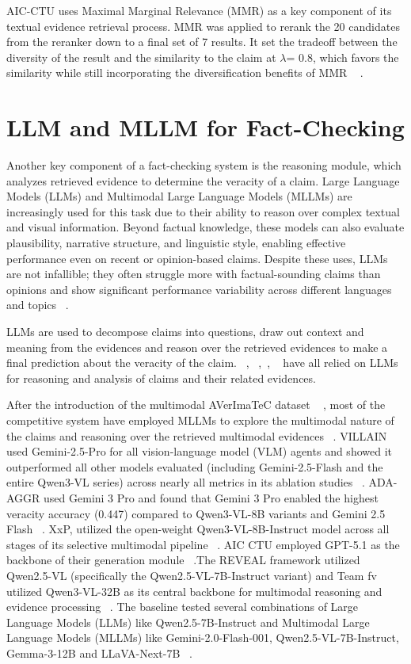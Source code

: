 AIC-CTU uses Maximal Marginal Relevance (MMR) as a key component of its textual evidence retrieval process. MMR was applied to rerank the 20 candidates from the reranker down to a final set of 7 results. It set the tradeoff between the diversity of the result and the similarity to the claim at $\lambda$= 0.8, which favors the similarity while still incorporating the diversification benefits of MMR  ~\cite{Ullrich2026Mar} .


\section{LLM and MLLM for Fact-Checking}

Another key component of a fact-checking system is the reasoning module, which analyzes retrieved evidence to determine the veracity of a claim. Large Language Models (LLMs) and Multimodal Large Language Models (MLLMs) are increasingly used for this task due to their ability to reason over complex textual and visual information. Beyond factual knowledge, these models can also evaluate plausibility, narrative structure, and linguistic style, enabling effective performance even on recent or opinion-based claims.
Despite these uses, LLMs are not infallible; they often struggle more with factual-sounding claims than opinions and show significant performance variability across different languages and topics ~\cite{Tang2024Nov}.

LLMs are used to decompose claims into questions, draw out context and meaning from the evidences and reason over the retrieved evidences to make a final prediction about the veracity of the claim. ~\citet{Schlichtkrull2023May}, ~\citet{Schlichtkrull2024Nov},~\citet{Ullrich2024Nov}, ~\citet{Ullrich2025Aug} have all relied on LLMs for reasoning and analysis of claims and their related evidences.

After the introduction of the multimodal AVerImaTeC  dataset  ~\cite{Cao2025May} , most of the competitive system have employed MLLMs to explore the multimodal nature of the claims and reasoning over the retrieved multimodal evidences ~\cite{Cao2026Mar}.
VILLAIN used Gemini-2.5-Pro for all vision-language model (VLM) agents and showed it outperformed all other models evaluated (including Gemini-2.5-Flash and the entire Qwen3-VL series) across nearly all metrics in its ablation studies ~\cite{Jung2026Mar}. ADA-AGGR used Gemini 3 Pro and found that Gemini 3 Pro enabled the highest veracity accuracy (0.447) compared to Qwen3-VL-8B variants and Gemini 2.5 Flash ~\cite{Upravitelev2026Mar}. XxP, utilized the open-weight Qwen3-VL-8B-Instruct model across all stages of its selective multimodal pipeline ~\cite{Tsoneva2026Mar}. AIC CTU employed GPT-5.1 as the backbone of their generation module ~\cite{Ullrich2026Mar}.The REVEAL framework utilized Qwen2.5-VL (specifically the Qwen2.5-VL-7B-Instruct variant) and Team fv utilized Qwen3-VL-32B as its central backbone for multimodal reasoning and evidence processing ~\cite{Tariq2026Mar}. The baseline tested several combinations of Large Language Models (LLMs) like Qwen2.5-7B-Instruct and Multimodal Large Language Models (MLLMs) like 
Gemini-2.0-Flash-001, Qwen2.5-VL-7B-Instruct, Gemma-3-12B and LLaVA-Next-7B ~\cite{Cao2025May}.

